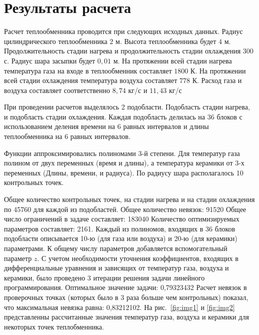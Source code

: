 \documentclass[a4paper,12pt]{article}
\begin{document}
\section{Результаты расчета}

Расчет теплообменника проводится при следующих исходных данных. Радиус
цилиндрического теплообменника $2$ м. Высота теплообменника будет $4$ м.
Продолжительность стадии нагрева и продолжительность стадии охлаждения
$300$ с. Радиус шара засыпки будет $0,01$ м. На протяжении всей стадии
нагрева температура газа на входе в теплообменник составляет $1800$ К.
На протяжении всей стадии охлаждения температура воздуха составляет
$778$ К. Расход газа и воздуха составляет соответственно $8,74$ кг/с и
$11,43$ кг/с

При проведении расчетов выделялось 2 подобласти. Подобласть стадии
нагрева, и подобласть стадии охлаждения. Каждая подобласть делилась на
36 блоков с использованием деления времени на 6 равных интервалов и
длины теплообменника на 6 равных интервалов.

Функции аппроксимировались полиномами 3-й степени. Для температур газа
полином от двух переменных (время и длины), а температура керамики от
3-х переменных (Длины, времени, и радиуса). По радиусу шара
располагалось 10 контрольных точек.

Общее количество контрольных точек, на стадии нагрева и на стадии
охлаждения по 45760 для каждой из подобластей. Общее количество
невязок: 91520 Общее число ограничений в задаче составляет: 183040
Количество оптимизируемых параметров составляет: 2161. Каждый из
полиномов, входящих в 36 блоков подобласти описывается 10-ю (для газа
или воздуха) и 20-ю (для керамики) параметрами. К общему числу
параметров добавляется вспомогательный параметр $z$. С учетом
необходимости уточнения коэффициентов, входящих в дифференциальные
уравнения и зависящих от температур газа, воздуха и керамики, было
проведено 3 итерации решения задачи линейного программирования.
Оптимальное значение задачи: 0,79323432 Расчет невязок в проверочных
точках (которых было в 3 раза больше чем контрольных) показал, что
максимальная невязка равна: 0,83212102. На рис.~\ref{fig:img1} и 
\ref{fig:img2} представленны рассчитанные значения температур газа,
воздуха и керамики для некоторых точек теплобменника.
\end{document}
